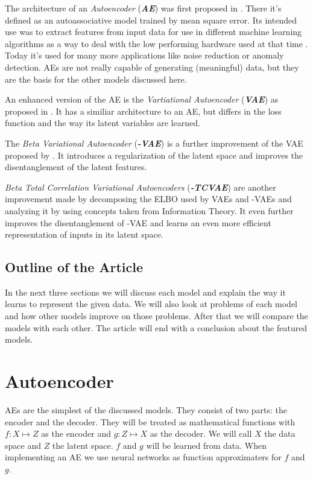 \documentclass[a4paper]{IEEEtran}
\begin{document}
The architecture of an \textit{Autoencoder} (\textit{\textbf{AE}}) was first proposed in \cite{ballard1987modulalearning}. There it's defined as an autoassociative model trained by mean square error. Its intended use was to extract features from input data for use in different machine learning algorithms as a way to deal with the low performing hardware used at that time \cite{ballard1987modulalearning}. Today it's used for many more applications like noise reduction or anomaly detection. AEs are not really capable of generating (meaningful) data, but they are the basis for the other models discussed here.

An enhanced version of the AE is the \textit{Vartiational Autoencoder} (\textit{\textbf{VAE}}) as proposed in \cite{kingma2014autoencoding}. It has a similiar architecture to an AE, but differs in the loss function and the way its latent variables are learned.

The \textit{Beta Variational Autoencoder} (\textit{\textbf{\textbeta -VAE}}) is a further improvement of the VAE proposed by \cite{higgins2017vae}. It introduces a regularization of the latent space and improves the disentanglement of the latent features.

\textit{Beta Total Correlation Variational Autoencoders} (\textit{\textbf{\textbeta -TCVAE}}) \cite{chen2019isolating} are another improvement made by decomposing the ELBO used by VAEs and \textbeta -VAEs and analyzing it by using concepts taken from Information Theory. It even further improves the disentanglement of \textbeta -VAE and learns an even more efficient representation of inputs in its latent space.

\subsection{Outline of the Article}
In the next three sections we will discuss each model and explain the way it learns to represent the given data. We will also look at problems of each model and how other models improve on those problems. After that we will compare the models with each other. The article will end with a conclusion about the featured models.

\section{Autoencoder}
AEs are the simplest of the discussed models. They consist of two parts: the encoder and the decoder. They will be treated as mathematical functions with $f : X \mapsto Z$ as the encoder and $g : Z \mapsto X$ as the decoder. We will call $X$ the data space and $Z$ the latent space. $f$ and $g$ will be learned from data. When implementing an AE we use neural networks as function approximaters for $f$ and $g$.
\end{document}
